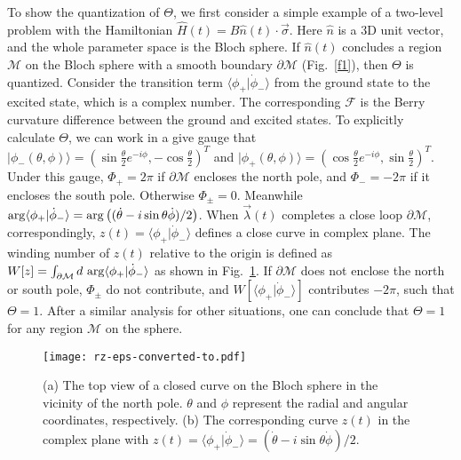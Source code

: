 \documentclass[aps,pra,twocolumn,groupedaddress,10pt]{revtex4}
\begin{document}
To show the quantization of $\Theta$, we first consider a
simple example of a two-level problem
with the Hamiltonian $\hat{H}(t) = B\hat{n}(t)\cdot \vec{\sigma}$.
Here $\hat{n}$ is a 3D unit vector, and the whole parameter space
is the Bloch sphere.
If $\hat{n}(t)$ concludes a region $\mathcal{M}$
on the Bloch sphere with a smooth boundary $\partial\mathcal{M}$ (Fig.~\ref{f1}), then $\Theta$ is quantized.
Consider the transition term $\langle \phi_{+}|\dot{\phi}_-\rangle$
from the ground state to the excited state, which is a complex number.
The corresponding $\mathcal{F}$
is the Berry curvature difference between the ground and excited states.
To explicitly calculate $\Theta$, we can work in a give gauge that
$|\phi_-(\theta,\phi)\rangle = (\sin\frac{\theta}{2}e^{-i\phi},-\cos\frac{\theta}{2})^T$ and
$|\phi_+(\theta,\phi)\rangle = (\cos\frac{\theta}{2}e^{-i\phi},\sin\frac{\theta}{2})^T$.
Under this gauge, $\Phi_+=2\pi$ if $\partial \mathcal{M}$
encloses the north pole, and $\Phi_-=-2\pi$ if it encloses
the south pole.
Otherwise $\Phi_\pm=0$.
Meanwhile ${\rm{arg}}\langle\phi_+|\dot{\phi}_-\rangle
= {\rm{arg}}\left((\dot{\theta}-i\sin\theta\dot{\phi})/2\right)$.
When $\vec{\lambda}(t)$ completes a close loop $\partial \mathcal{M}$,
correspondingly, $z(t)=\langle\phi_+|\dot{\phi}_-\rangle$
defines a close curve in complex plane.
The winding number of $z(t)$ relative to the origin
is defined as $W[z] = \int_{\partial \mathcal{M}}d ~{\rm{arg}}\langle\phi_+|\dot{\phi}_-\rangle$
as shown in Fig.~\ref{rz}.
If $\partial \mathcal{M}$ does not enclose the north or south pole,
$\Phi_\pm$ do not contribute, and
$W[\langle\phi_+|\dot{\phi}_-\rangle]$ contributes $-2\pi$,
such that $\Theta = 1$.
After a similar analysis for other situations, one can conclude
that $\Theta=1$ for any region $\mathcal{M}$ on the sphere.

\begin{figure}
\texttt{[image: rz-eps-converted-to.pdf]}
\caption{(a) The top view of a closed curve on the Bloch sphere
in the vicinity of the north pole.
$\theta$ and $\phi$ represent the radial and angular coordinates,
respectively.
(b) The corresponding curve $z(t)$ in the complex plane with
$z(t)=\langle\phi_+|\dot{\phi}_-\rangle = (\dot{\theta}-i\sin\theta\dot{\phi})/2$.}
\label{rz}
\end{figure}
\end{document}
